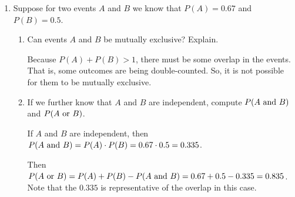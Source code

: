 \documentclass{article}
\newcommand{\answer}[1]{\color{white}#1}
\begin{document}
\begin{enumerate}
\begin{enumerate}
	{\answer Since there are 4 aces and 48 non-aces, we must have drawn 49 cards to be CERTAIN that we have drawn an ace.  Drawing any fewer could still leave the 4 aces in the stack of untouched cards.} 
	
	\item What is the probability that if you draw 5 cards that you have NO aces? 
	
	{\answer One way to approach this is to think that the first card is NOT an ace, and then the second card is NOT an ace, and then the third card is NOT an ace... 
	
	$\frac{48}{52} \times \frac{47}{51} \times \frac{46}{50} \times \frac{45}{49} \times \frac{44}{48} = 0.6588419983$.} 

	\end{enumerate}

\medskip

\item Suppose for two events $A$ and $B$ we know that $P(A) = 0.67$ and $P(B) = 0.5$.
	\begin{enumerate}
	\item Can events $A$ and $B$ be mutually exclusive?  Explain. 
	
	{\answer Because $P(A)+P(B) >1$, there must be some overlap in the events.  That is, some outcomes are being double-counted.  So, it is not possible for them to be mutually exclusive.} 
	
	\item If we further know that $A$ and $B$ are independent, compute $P(A \textnormal{ and } B)$ and $P(A \textnormal{ or } B)$. 
	
	{\answer If $A$ and $B$ are independent, then $P(A \textnormal{ and } B) = P(A)\cdot P(B) = 0.67\cdot 0.5 = 0.335$. 
	
	Then $P(A \textnormal{ or } B) = P(A)+P(B)- P(A \textnormal{ and } B) = 0.67 + 0.5 - 0.335 = 0.835$. \\ Note that the $0.335$ is representative of the overlap in this case.} 
	
	\end{enumerate}

\end{enumerate}
\end{document}
